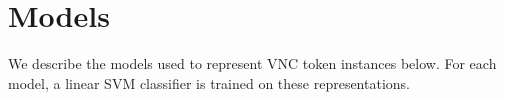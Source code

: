\documentclass[11pt,a4paper]{article}
\begin{document}

\section{Models}\label{models}


We describe the models used to represent VNC token instances
below. For each model, a linear SVM classifier is trained on these
representations.


\end{document}
